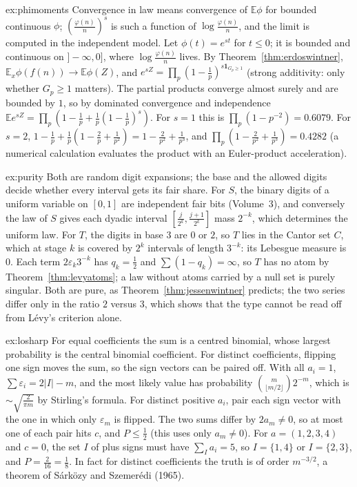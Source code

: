 \begin{solution}{ex:phimoments}
\idea Convergence in law means convergence of $\mathbb E\phi$ for bounded continuous $\phi$; $(\frac{\varphi(n)}n)^s$ is such a function of $\log\frac{\varphi(n)}n$, and the limit is computed in the independent model.
\writeup Let $\phi(t)=e^{st}$ for $t\le0$; it is bounded and continuous on $]-\infty,0]$, where $\log\frac{\varphi(n)}n$ lives. By Theorem~\ref{thm:erdoswintner}, $\mathbb E_x\phi(f(n))\to\mathbb E\phi(Z)$, and $e^{sZ}=\prod_p(1-\frac1p)^{s\mathbf 1_{G_p\ge1}}$ (strong additivity: only whether $G_p\ge1$ matters). The partial products converge almost surely and are bounded by $1$, so by dominated convergence and independence $\mathbb Ee^{sZ}=\prod_p(1-\frac1p+\frac1p(1-\frac1p)^s)$. For $s=1$ this is $\prod_p(1-p^{-2})=0.6079$. For $s=2$, $1-\frac1p+\frac1p(1-\frac2p+\frac1{p^2})=1-\frac2{p^2}+\frac1{p^3}$, and $\prod_p(1-\frac2{p^2}+\frac1{p^3})=0.4282$ (a numerical calculation evaluates the product with an Euler-product acceleration).
\end{solution}

\begin{solution}{ex:purity}
\idea Both are random digit expansions; the base and the allowed digits decide whether every interval gets its fair share.
\writeup For $S$, the binary digits of a uniform variable on $[0,1]$ are independent fair bits (Volume~3), and conversely the law of $S$ gives each dyadic interval $[\frac j{2^k},\frac{j+1}{2^k}]$ mass $2^{-k}$, which determines the uniform law. For $T$, the digits in base $3$ are $0$ or $2$, so $T$ lies in the Cantor set $C$, which at stage $k$ is covered by $2^k$ intervals of length $3^{-k}$: its Lebesgue measure is $0$. Each term $2\varepsilon_k3^{-k}$ has $q_k=\frac12$ and $\sum(1-q_k)=\infty$, so $T$ has no atom by Theorem~\ref{thm:levyatoms}; a law without atoms carried by a null set is purely singular. Both are pure, as Theorem~\ref{thm:jessenwintner} predicts; the two series differ only in the ratio $2$ versus $3$, which shows that the type cannot be read off from L\'evy's criterion alone.
\end{solution}

\begin{solution}{ex:losharp}
\idea For equal coefficients the sum is a centred binomial, whose largest probability is the central binomial coefficient. For distinct coefficients, flipping one sign moves the sum, so the sign vectors can be paired off.
\writeup With all $a_i=1$, $\sum\varepsilon_i=2|I|-m$, and the most likely value has probability $\binom m{\lfloor m/2\rfloor}2^{-m}$, which is $\sim\sqrt{\frac2{\pi m}}$ by Stirling's formula. For distinct positive $a_i$, pair each sign vector with the one in which only $\varepsilon_m$ is flipped. The two sums differ by $2a_m\ne0$, so at most one of each pair hits $c$, and $P\le\frac12$ (this uses only $a_m\ne0$). For $a=(1,2,3,4)$ and $c=0$, the set $I$ of plus signs must have $\sum_{I}a_i=5$, so $I=\{1,4\}$ or $I=\{2,3\}$, and $P=\frac2{16}=\frac18$. In fact for distinct coefficients the truth is of order $m^{-3/2}$, a theorem of S\'ark\"ozy and Szemer\'edi (1965).
\end{solution}

